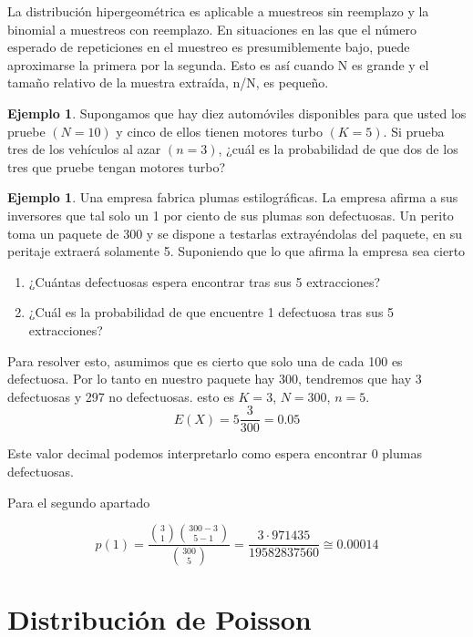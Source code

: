 \documentclass[]{book}
\theoremstyle{plain}
\theoremstyle{definition}
\newtheorem{example}[theorem]{Ejemplo}
\theoremstyle{definition} %
\begin{document}
La distribución hipergeométrica es aplicable a muestreos sin reemplazo y
la binomial a muestreos con reemplazo. En situaciones en las que el
número esperado de repeticiones en el muestreo es presumiblemente bajo,
puede aproximarse la primera por la segunda. Esto es así cuando N es
grande y el tamaño relativo de la muestra extraída, n/N, es pequeño.

\begin{example}
Supongamos que hay diez automóviles disponibles para que usted los
pruebe \((N = 10)\) y cinco de ellos tienen motores turbo \((K = 5)\).
Si prueba tres de los vehículos al azar \((n = 3)\), ¿cuál es la
probabilidad de que dos de los tres que pruebe tengan motores turbo?
\end{example}

\begin{example}
 Una empresa fabrica plumas estilográficas. La empresa afirma a sus inversores que tal solo un 1 por ciento de 
 sus plumas son defectuosas. Un perito toma un paquete de 300 y se dispone a testarlas extrayéndolas del paquete, 
 en su peritaje extraerá solamente 5. Suponiendo que 
 lo que afirma la empresa sea cierto
 \begin{enumerate}
   \item ¿Cuántas defectuosas espera encontrar tras sus 5 extracciones?
   \item ¿Cuál es la probabilidad de que encuentre 1 defectuosa tras sus 5 extracciones?
 \end{enumerate}
 
 Para resolver esto, asumimos que es cierto que solo una de cada 100 es defectuosa. Por lo tanto en nuestro paquete hay 300, 
 tendremos que hay 3 defectuosas y 297 no defectuosas. esto es $K=3$, $N=300$, $n=5$.
 \[E(X) = 5 \frac{3}{300} = 0.05\]

 Este valor decimal podemos interpretarlo como espera encontrar 0 plumas defectuosas.

 Para el segundo apartado

 \[p(1) = \frac {{\binom {3}{1}}{\binom {300-3}{5-1}}}{\binom {300}{5}} = \frac{3 \cdot 971435}{19582837560} \cong 0.00014 \]
  
  \end{example}
 
\section{Distribución de Poisson} 
\end{document}

